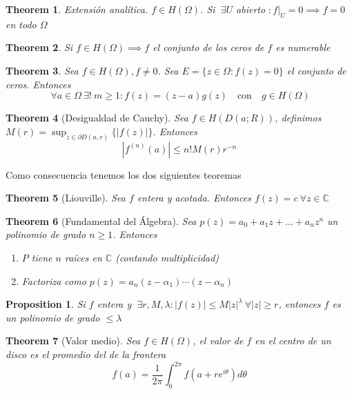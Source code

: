 \documentclass{myclass}
\newtheorem*{theorem}{Theorem}
\newtheorem*{proposition}{Proposition}
\begin{document}
\begin{theorem}
Extensión analítica. $f\in H(\Omega)$. Si $\ \exists U$ abierto $: f|_U=0 \implies f=0$ en todo $\Omega$
\end{theorem}

\begin{theorem}
Si $f\in H(\Omega) \implies f$ el conjunto de los ceros de $f$ es numerable
\end{theorem}

\begin{theorem} Sea $f\in H(\Omega), f\neq 0$. Sea $E = \{z\in \Omega : f(z) = 0\}$ el conjunto de ceros. Entonces
  \[
  \ \forall a\in \Omega \ \exists ! \ m\ge 1 : f(z) = (z-a)g(z) \quad \text{con} \quad g\in H(\Omega)
  \] 

\end{theorem}

\begin{theorem}[Desigualdad de Cauchy]
Sea $f\in H(D(a;R))$, definimos $M(r) = \sup_{z\in \partial D(a, r)} \{|f(z)|\}$. Entonces
\[
|f^{(n)}(a)|\le n! M(r) r^{-n}
\] 
\end{theorem}

Como consecuencia tenemos los dos siguientes teoremas

\begin{theorem}[Liouville]
Sea $f$ entera y acotada. Entonces $f(z) = c \ \forall z\in \mathbb{C}$ 
\end{theorem}

\begin{theorem}[Fundamental del Álgebra]
Sea $p(z) = a_0 + a_1z + \ldots + a_nz^n$ un polinomio de grado $n\ge 1$. Entonces 
\begin{enumerate}[topsep=-6pt, itemsep=0pt]
  \item $P$ tiene  $n$ raíces en  $\mathbb{C}$ (contando multiplicidad) 
  \item Factoriza como  $p(z)= a_n(z-\alpha _1) \cdots (z-\alpha _n)$
\end{enumerate}
\end{theorem}

\begin{proposition}
Si $f$ entera y $\ \exists r, M, \lambda: |f(z)|\le M|z|^\lambda \ \forall |z|\ge r$, entonces $f$ es un polinomio de grado  $\le \lambda$
\end{proposition}

\begin{theorem}[Valor medio]
Sea $f\in H(\Omega)$, el valor de $f$ en el centro de un disco es el promedio del de la frontera
\[
f(a) = \frac{1}{2\pi}\int_0^{2\pi}f(a+ re^{i \theta}) d\theta
\] 
\end{theorem}
\end{document}
